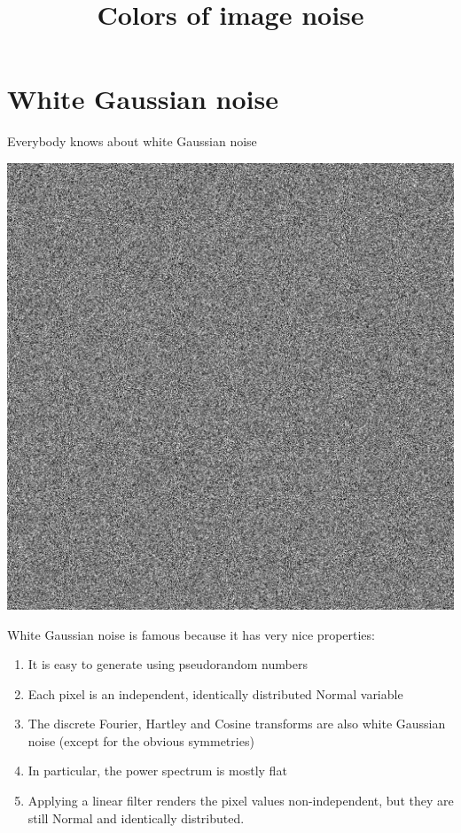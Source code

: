 \title{Colors of image noise}


\section{White Gaussian noise}

Everybody knows about white Gaussian noise

\includegraphics{white.png}


White Gaussian noise is famous because it has very nice properties:

\begin{enumerate}
	\item It is easy to generate using pseudorandom numbers
	\item Each pixel is an independent, identically distributed Normal
		variable
	\item The discrete Fourier, Hartley and Cosine transforms are also
		white Gaussian noise (except for the obvious symmetries)
	\item In particular, the power spectrum is mostly flat
	\item Applying a linear filter renders the pixel values
		non-independent, but they are still Normal and identically
		distributed.
\end{enumerate}


